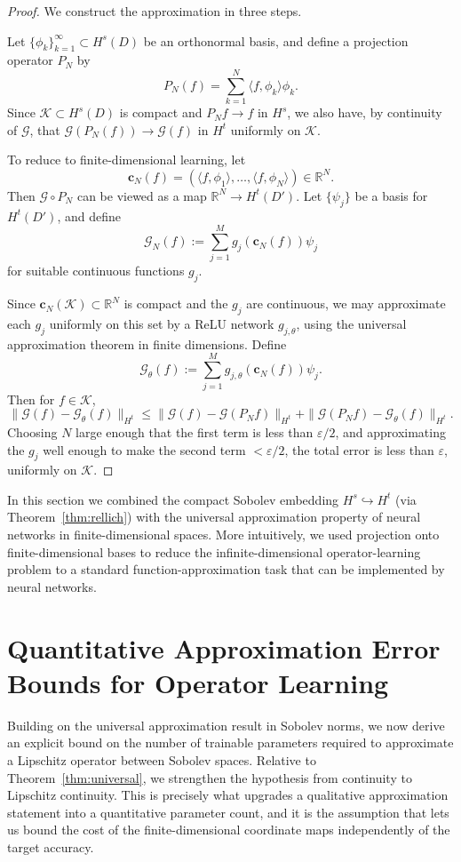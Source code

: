 \documentclass[11pt]{article}
\theoremstyle{plain}
\theoremstyle{definition}
\theoremstyle{remark}
\begin{document}
\begin{proof}
We construct the approximation in three steps.

Let $\{ \phi_k \}_{k=1}^\infty \subset H^s(D)$ be an orthonormal basis, and define a projection operator $P_N$ by
\[
P_N (f) = \sum_{k=1}^N \langle f, \phi_k \rangle \phi_k.
\]
Since $\mathcal{K} \subset H^s(D)$ is compact and $P_N f \to f$ in $H^s$, we also have, by continuity of $\mathcal{G}$, that $\mathcal{G}(P_N(f)) \to \mathcal{G}(f)$ in $H^t$ uniformly on $\mathcal{K}$.

To reduce to finite-dimensional learning, let
\[
\mathbf{c}_N(f) = (\langle f, \phi_1 \rangle, \dots,
\langle f, \phi_N \rangle) \in \mathbb{R}^N.
\]
Then $\mathcal{G} \circ P_N$ can be viewed as a map
$\mathbb{R}^N \to H^t(D')$. Let $\{\psi_j\}$ be a basis for $H^t(D')$, and define
\[
\mathcal{G}_N(f) := \sum_{j=1}^M g_j(\mathbf{c}_N(f)) \psi_j
\]
for suitable continuous functions $g_j$.

Since $\mathbf{c}_N(\mathcal{K}) \subset \mathbb{R}^N$ is compact and the $g_j$ are continuous, we may approximate each $g_j$ uniformly on this set by a ReLU network $g_{j,\theta}$, using the universal approximation theorem in finite dimensions. Define
\begin{equation}
    \mathcal{G}_\theta(f) := \sum_{j=1}^M g_{j,\theta}(\mathbf{c}_N(f)) \psi_j.
\end{equation}
Then for $f \in \mathcal{K}$,
\[
\| \mathcal{G}(f) - \mathcal{G}_\theta(f) \|_{H^t}
\leq \| \mathcal{G}(f) - \mathcal{G}(P_N f) \|_{H^t}
+ \| \mathcal{G}(P_N f) - \mathcal{G}_\theta(f) \|_{H^t}.
\]
Choosing $N$ large enough that the first term is less than $\varepsilon/2$, and approximating the $g_j$ well enough to make the second term $< \varepsilon/2$, the total error is less than $\varepsilon$, uniformly on $\mathcal{K}$.
\end{proof}

\noindent
In this section we combined the compact Sobolev embedding
$H^s \hookrightarrow H^t$ (via Theorem~\ref{thm:rellich}) with the universal approximation property of neural networks in finite-dimensional spaces. More
intuitively, we used projection onto finite-dimensional bases to reduce the infinite-dimensional operator-learning problem to a standard function-approximation task that can be implemented by neural networks.

\section{Quantitative Approximation Error Bounds for Operator Learning}
\label{sec:quantitative-bound}
Building on the universal approximation result in Sobolev norms, we now derive an explicit bound on the number of trainable parameters required to approximate a Lipschitz operator between Sobolev spaces. Relative to
Theorem~\ref{thm:universal}, we strengthen the hypothesis from continuity to Lipschitz continuity. This is precisely what upgrades a qualitative approximation statement into a quantitative parameter count, and it is the assumption that lets us bound the cost of the finite-dimensional coordinate maps independently of the target accuracy.
\end{document}
